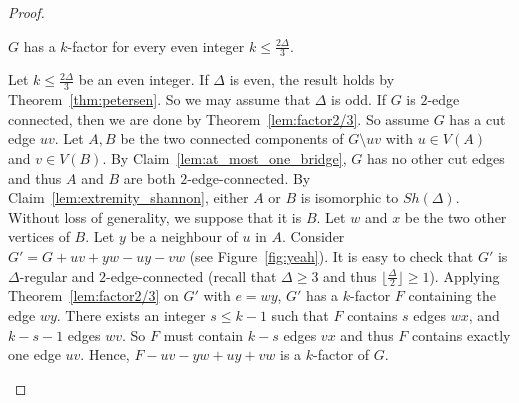 \begin{proof}
\begin{claim}\label{lem:delta_odd_k_even_extract_factor}
$G$ has a $k$-factor for every even integer $k \leq \frac{2\Delta}{3}$. %
\end{claim}

\begin{proofclaim}
Let $k \leq \frac{2 \Delta}{3}$ be an even integer. 
If $\Delta$ is even, the result holds by Theorem~\ref{thm:petersen}. So we may assume that $\Delta$ is odd. 
If $G$ is $2$-edge connected, then we are done by Theorem~\ref{lem:factor2/3}. 
So assume $G$ has a cut edge $uv$. Let $A, B$ be the two connected components of $G \setminus uv$ with $u \in V(A)$ and $v \in V(B)$. By Claim~\ref{lem:at_most_one_bridge}, $G$ has no other cut edges and thus $A$ and $B$ are both $2$-edge-connected. 
By Claim~\ref{lem:extremity_shannon}, either $A$ or $B$ is isomorphic to $Sh(\Delta)$.  Without loss of generality, we suppose that it is $B$. 
Let $w$ and $x$ be the two other vertices of $B$. Let $y$ be a neighbour of $u$ in $A$. 
Consider $G' = G + uv + yw - uy - vw$ (see Figure~\ref{fig:yeah}). It is easy to check that $G'$ is $\Delta$-regular and $2$-edge-connected (recall that $\Delta \geq 3$ and thus $\lfloor \frac{\Delta}{2} \rfloor \geq 1$). Applying  Theorem~\ref{lem:factor2/3} on $G'$ with $e = wy$, $G'$ has a $k$-factor $F$ containing the edge $wy$. 
There exists an integer $s \leq k-1$ such that $F$ contains $s$ edges $wx$, and $k-s-1$ edges $wv$. So $F$ must contain $k-s$ edges $vx$ and thus $F$ contains exactly one edge $uv$. 
Hence, $F - uv - yw + uy + vw$ is a $k$-factor of $G$.
\end{proofclaim}


\end{proof}
